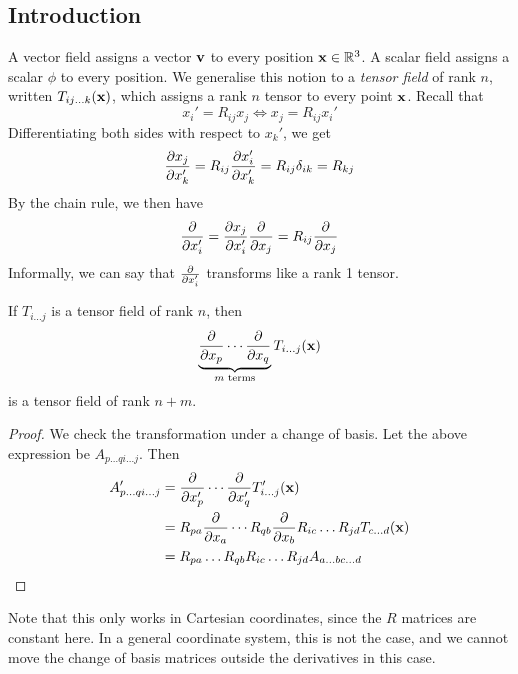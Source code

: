 \subsection{Introduction}
A vector field assigns a vector \(\vb v\) to every position \(\vb x \in \mathbb R^3\).
A scalar field assigns a scalar \(\phi\) to every position.
We generalise this notion to a \textit{tensor field} of rank \(n\), written \(T_{ij\dots k}(\vb x)\), which assigns a rank \(n\) tensor to every point \(\vb x\).
Recall that
\[
	x_i' = R_{ij}x_j \iff x_j = R_{ij}x_i'
\]
Differentiating both sides with respect to \(x_k'\), we get
\[
	\pdv{x_j}{x_k'} = R_{ij} \pdv{x_i'}{x_k'} = R_{ij} \delta_{ik} = R_{kj}
\]
By the chain rule, we then have
\[
	\pdv{x_i'} = \pdv{x_j}{x_i'} \pdv{x_j} = R_{ij} \pdv{x_j}
\]
Informally, we can say that \(\pdv{x_i'}\) transforms like a rank 1 tensor.
\begin{proposition}
	If \(T_{i\dots j}\) is a tensor field of rank \(n\), then
	\[
		\underbrace{\pdv{x_p} \cdots \pdv{x_q}}_{m \text{ terms}} T_{i\dots j}(\vb x)
	\]
	is a tensor field of rank \(n+m\).
\end{proposition}
\begin{proof}
	We check the transformation under a change of basis.
	Let the above expression be \(A_{p\dots q i \dots j}\).
	Then
	\begin{align*}
		A_{p\dots q i\dots j}' & = \pdv{x_p'} \cdots \pdv{x_q'} T_{i\dots j}'(\vb x)                            \\
		                       & = R_{pa}\pdv{x_a} \cdots R_{qb}\pdv{x_b} R_{ic}\dots R_{jd}T_{c\dots d}(\vb x) \\
		                       & = R_{pa}\dots R_{qb}R_{ic}\dots R_{jd} A_{a\dots bc\dots d}
	\end{align*}
\end{proof}
\noindent Note that this only works in Cartesian coordinates, since the \(R\) matrices are constant here.
In a general coordinate system, this is not the case, and we cannot move the change of basis matrices outside the derivatives in this case.

